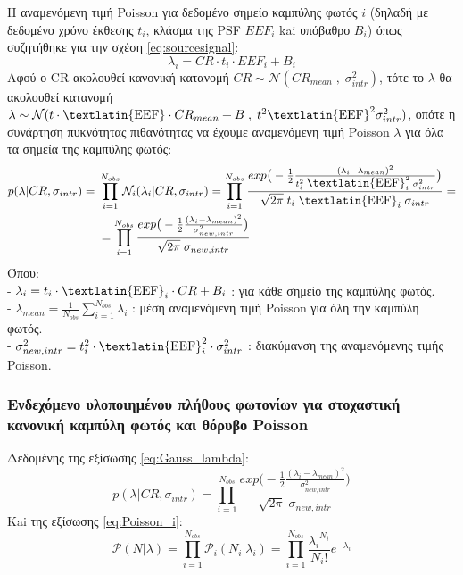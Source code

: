 Η αναμενόμενη τιμή \textlatin{Poisson} για δεδομένο σημείο καμπύλης φωτός $i$ (δηλαδή με δεδομένο χρόνο έκθεσης $t_i$, κλάσμα της \textlatin{PSF} $EEF_i$ kai υπόβαθρο $B_i$) όπως συζητήθηκε για την σχέση \ref{eq:sourcesignal}:    
$$\lambda_i = CR \cdot t_i \cdot EEF_i + B_i$$ 
Αφού ο \textlatin{CR} ακολουθεί κανονική κατανομή $ CR \sim \mathcal{N} (CR_{mean}\;,\; \sigma_{intr}^2)$, τότε το $\lambda$ θα ακολουθεί κατανομή $\lambda \sim \mathcal{N} (t\cdot \mbox{\textlatin{EEF}} \cdot CR_{mean}+ B\;,\; t^2 \mbox{\textlatin{EEF}}^2\sigma_{intr}^2)$, οπότε η συνάρτηση πυκνότητας πιθανότητας να έχουμε αναμενόμενη τιμή \textlatin{Poisson}  $\lambda$ για όλα τα σημεία της καμπύλης φωτός:
\begin{equation}\begin{aligned} {p} (\lambda|CR, \sigma_{intr})= {} & \prod_{i=1}^{N_{obs}} \mathcal{N}_i(\lambda_i| CR,\sigma_{intr}) = \prod_{i=1}^{N_{obs}} \dfrac{exp \big(-\frac{1}{2} \frac{( \lambda_i-\lambda_{mean} )^2}{t_i^2\; \mbox{\textlatin{EEF}}_i^2\;\sigma_{intr}^2}  \big)} {\sqrt{2\pi}\; t_i\; \mbox{\textlatin{EEF}}_i\;\sigma_{intr}} =\\ & =    \prod_{i=1}^{N_{obs}} \dfrac{exp \big(-\frac{1}{2} \frac{( \lambda_i-\lambda_{mean} )^2}{\sigma_{new, intr}^2}  \big)} {\sqrt{2\pi} \; \sigma_{new, intr}}   \label{eq:Gauss_lambda}\end{aligned}\end{equation}
Όπου:\\
- $\lambda_i = t_i\cdot \mbox{\textlatin{EEF}}_i \cdot CR + B_i$ : για κάθε σημείο της καμπύλης φωτός.\\
- $\lambda_{mean} = \frac{1}{N_{obs}} \sum_{i=1}^{N_{obs}} \lambda_i$ : μέση αναμενόμενη τιμή \textlatin{Poisson} για όλη την καμπύλη φωτός.\\
- $\sigma_{new, intr}^2 = t_i^2\cdot \mbox{\textlatin{EEF}}_i^2 \cdot \sigma_{intr}^2 $ : διακύμανση της αναμενόμενης τιμής \textlatin{Poisson}.\\

\subsubsection*{Ενδεχόμενο υλοποιημένου πλήθους φωτονίων για στοχαστική κανονική καμπύλη φωτός και θόρυβο \textlatin{Poisson}}

Δεδομένης της εξίσωσης \ref{eq:Gauss_lambda}:
$$ {p} (\lambda|CR, \sigma_{intr})=  \prod_{i=1}^{N_{obs}} \dfrac{exp \big(-\frac{1}{2} \frac{( \lambda_i-\lambda_{mean} )^2}{\sigma_{new, intr}^2}  \big)} {\sqrt{2\pi} \; \sigma_{new, intr}}$$ 
Kai της εξίσωσης \ref{eq:Poisson_i}: 
$$\mathcal{P}(N|\lambda) = \prod_{i=1}^{N_{obs}} \mathcal{P}_i(N_i|\lambda_i) =\prod_{i=1}^{N_{obs}} \dfrac{{\lambda_i}^{N_i}}{N_i !} e^{-\lambda_i} $$

